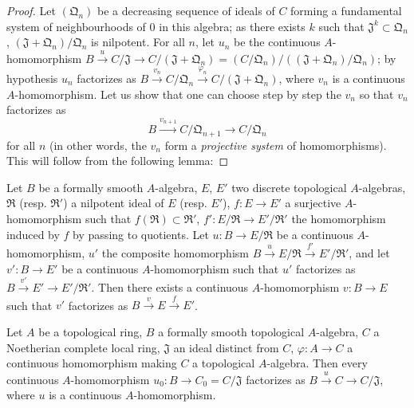 \begin{proof}
Let $(\mathfrak{Q}_n)$ be a decreasing sequence of ideals of $C$ forming a fundamental system of neighbourhoods of $0$ in this algebra;
as there exists $k$ such that $\mathfrak{J}^k\subset\mathfrak{Q}_n$, $(\mathfrak{J}+\mathfrak{Q}_n)/\mathfrak{Q}_n$ is nilpotent.
For all $n$, let $u_n$ be the continuous $A$-homomorphism $B\xrightarrow{u}C/\mathfrak{J}\to C/(\mathfrak{J}+\mathfrak{Q}_n)=(C/\mathfrak{Q}_n)/((\mathfrak{J}+\mathfrak{Q}_n)/\mathfrak{Q}_n)$;
by hypothesis $u_n$ factorizes as $B\xrightarrow{v_n}C/\mathfrak{Q}_n\xrightarrow{\varphi_n}C/(\mathfrak{J}+\mathfrak{Q}_n)$, where $v_n$ is a continuous $A$-homomorphism.
Let us show that one can choose step by step the $v_n$ so that $v_n$ factorizes as
\[
  B\xrightarrow{v_{n+1}}C/\mathfrak{Q}_{n+1}\to C/\mathfrak{Q}_n
\]
for all $n$ (in other words, the $v_n$ form a \emph{projective system} of homomorphisms).
This will follow from the following lemma:
\end{proof}

\begin{lemma}[19.3.10.1]
\label{0.19.3.10.1}
Let $B$ be a formally smooth $A$-algebra, $E$, $E'$ two discrete topological $A$-algebras, $\mathfrak{R}$ (resp. $\mathfrak{R}'$) a nilpotent ideal of $E$ (resp. $E'$), $f:E\to E'$ a surjective $A$-homomorphism such that $f(\mathfrak{R})\subset\mathfrak{R}'$, $f':E/\mathfrak{R}\to E'/\mathfrak{R}'$ the homomorphism induced by $f$ by passing to quotients.
Let $u:B\to E/\mathfrak{R}$ be a continuous $A$-homomorphism, $u'$ the composite homomorphism $B\xrightarrow{u}E/\mathfrak{R}\xrightarrow{f'}E'/\mathfrak{R}'$, and let $v':B\to E'$ be a continuous $A$-homomorphism such that $u'$ factorizes as $B\xrightarrow{v'}E'\to E'/\mathfrak{R}'$.
Then there exists a continuous $A$-homomorphism $v:B\to E$ such that $v'$ factorizes as $B\xrightarrow{v}E\xrightarrow{f}E'$.
\end{lemma}

\begin{corollary}[19.3.11]
\label{0.19.3.11}
Let $A$ be a topological ring, $B$ a formally smooth topological $A$-algebra, $C$ a Noetherian complete local ring, $\mathfrak{J}$ an ideal distinct from $C$, $\varphi:A\to C$ a continuous homomorphism making $C$ a topological $A$-algebra.
Then every continuous $A$-homomorphism $u_0:B\to C_0=C/\mathfrak{J}$ factorizes as $B\xrightarrow{u}C\to C/\mathfrak{J}$, where $u$ is a continuous $A$-homomorphism.
\end{corollary}

